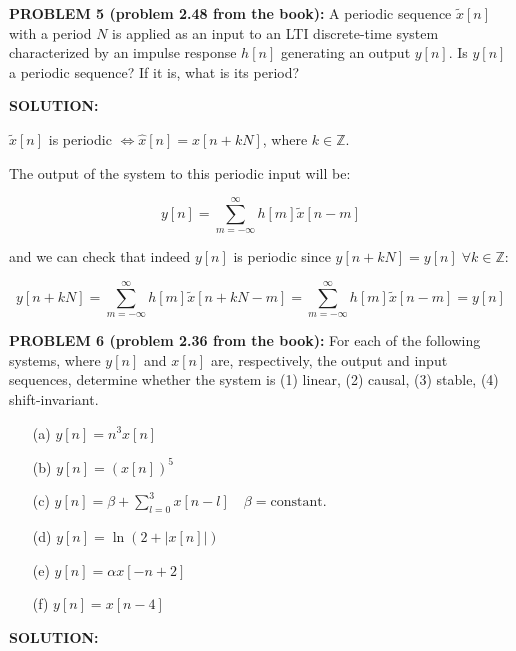 \documentclass[11pt]{article}
\begin{document}
\vspace{1cm}

\textbf{PROBLEM 5 (problem 2.48 from the book):} A periodic sequence $\tilde{x}[n]$ with a period $N$ is applied as an input to an LTI discrete-time system characterized by an impulse response $h[n]$ generating an output $y[n]$. Is $y[n]$ a periodic sequence? If it is, what is its period?

\vspace{1cm}

\textbf{SOLUTION:}

$\tilde{x}[n]$ is periodic $\Longleftrightarrow\hat{x}[n]=\hat{x}[n+kN]$, where $k\in\mathbb{Z}$.

The output of the system to this periodic input will be:

\[
y[n] = \sum_{m=-\infty}^{\infty}h[m]\tilde{x}[n-m]
\]

and we can check that indeed $y[n]$ is periodic since $y[n+kN]=y[n]\;\forall k \in\mathbb{Z}$:

\[
y[n+kN] = \sum_{m=-\infty}^{\infty}h[m]\tilde{x}[n+kN-m]=\sum_{m=-\infty}^{\infty}h[m]\tilde{x}[n-m]=y[n]
\]


\vspace{1cm}

\textbf{PROBLEM 6 (problem 2.36 from the book):} For each of the following systems, where $y[n]$ and $x[n]$ are, respectively, the output and input sequences, determine whether the system is (1) linear, (2) causal, (3) stable, (4) shift-invariant.


\begin{itemize}
\item[(a)] $y[n]=n^3x[n]$

\item[(b)] $y[n]=(x[n])^5$


\item[(c)] $y[n]=\beta+\sum_{l=0}^{3} x[n-l] \quad \beta=\textrm{constant}$.

\item[(d)] $y[n]=\ln(2+|x[n]|)$ 


\item[(e)] $y[n]=\alpha x[-n+2]$

\item[(f)] $y[n]=x[n-4]$


\end{itemize}



\vspace{1cm}

\textbf{SOLUTION:}
\end{document}
